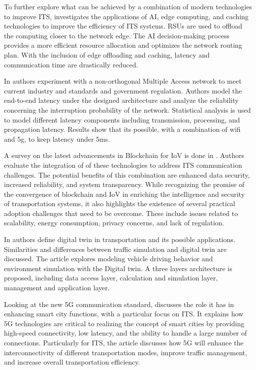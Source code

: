 To further explore what can be achieved by a combination of modern technologies to improve ITS, \cite{dai2019artificial} investigates the applications of AI, edge computing, and caching technologies to improve the efficiency of ITS systems. RSUs are used to offload the computing closer to the network edge. The AI decision-making process provides a more efficient resource allocation and optimizes the network routing plan. With the inclusion of edge offloading and caching, latency and communication time are drastically reduced.

In \cite{tanwar2019tactile} authors experiment with a non-orthogonal Multiple Access network to meet current industry and standards and government regulation. Authors model the end-to-end latency under the designed architecture and analyze the reliability concerning the interruption probability of the network. Statistical analysis is used to model different latency components including transmission, processing, and propagation latency. Results show that its possible, with a combination of wifi and 5g, to keep latency under 5ms.

A survey on the latest advancements in Blockchain for IoV is done in \cite{Mollah_2021}. Authors evaluate the integration of of these technologies to address ITS communication challenges. The potential benefits of this combination are enhanced data security, increased reliability, and system transparency. While recognizing the promise of the convergence of blockchain and IoV in enriching the intelligence and security of transportation systems, it also highlights the existence of several practical adoption challenges that need to be overcome. These include issues related to scalability, energy consumption, privacy concerns, and lack of regulation.

In \cite{bao2021review} authors define digital twin in transportation and its possible applications. Similarities and differences between traffic simulation and digital twin are discussed. The article explores modeling vehicle driving behavior and environment simulation with the Digital twin. A three layers architecture is proposed, including data access layer, calculation and simulation layer, management and application layer.

Looking at the new 5G communication standard, \cite{gohar2021role} discusses the role it has in enhancing smart city functions, with a particular focus on ITS. It explains how 5G technologies are critical to realizing the concept of smart cities by providing high-speed connectivity, low latency, and the ability to handle a large number of connections. Particularly for ITS, the article discusses how 5G will enhance the interconnectivity of different transportation modes, improve traffic management, and increase overall transportation efficiency. 

